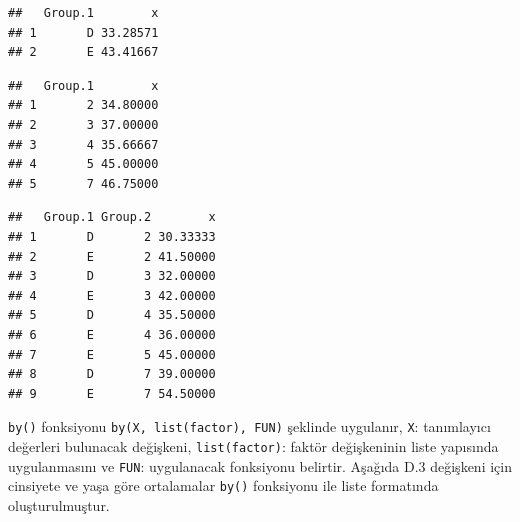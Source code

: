\documentclass[
]{book}
\newenvironment{Shaded}{\begin{snugshade}}{\end{snugshade}}
\newcommand{\CommentTok}[1]{\textcolor[rgb]{0.56,0.35,0.01}{\textit{#1}}}
\newcommand{\FloatTok}[1]{\textcolor[rgb]{0.00,0.00,0.81}{#1}}
\newcommand{\FunctionTok}[1]{\textcolor[rgb]{0.13,0.29,0.53}{\textbf{#1}}}
\newcommand{\NormalTok}[1]{#1}
\newcommand{\SpecialCharTok}[1]{\textcolor[rgb]{0.81,0.36,0.00}{\textbf{#1}}}
\begin{document}
\begin{verbatim}
##   Group.1        x
## 1       D 33.28571
## 2       E 43.41667
\end{verbatim}

\begin{Shaded}
\end{Shaded}

\begin{verbatim}
##   Group.1        x
## 1       2 34.80000
## 2       3 37.00000
## 3       4 35.66667
## 4       5 45.00000
## 5       7 46.75000
\end{verbatim}

\begin{Shaded}
\end{Shaded}

\begin{verbatim}
##   Group.1 Group.2        x
## 1       D       2 30.33333
## 2       E       2 41.50000
## 3       D       3 32.00000
## 4       E       3 42.00000
## 5       D       4 35.50000
## 6       E       4 36.00000
## 7       E       5 45.00000
## 8       D       7 39.00000
## 9       E       7 54.50000
\end{verbatim}

\texttt{by()} fonksiyonu \texttt{by(X,\ list(factor),\ FUN)} şeklinde uygulanır, \texttt{X}: tanımlayıcı değerleri bulunacak değişkeni, \texttt{list(factor)}: faktör değişkeninin liste yapısında uygulanmasını ve \texttt{FUN}: uygulanacak fonksiyonu belirtir. Aşağıda D.3 değişkeni için cinsiyete ve yaşa göre ortalamalar \texttt{by()} fonksiyonu ile liste formatında oluşturulmuştur.

\begin{Shaded}
\end{Shaded}
\end{document}
